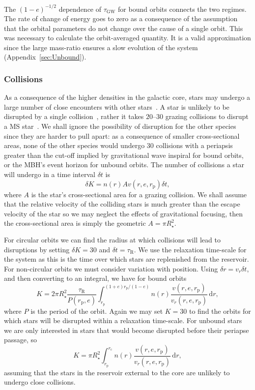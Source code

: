 \documentclass[useAMS,usedcolumn,usegraphicx,usenatbib]{mn2e}
\newcommand{\apref}[1]{Appendix~\ref{sec:#1}}
\newcommand{\sub}[1]{\ensuremath{_\mathrm{#1}}}
\newcommand{\dd}{\ensuremath{\mathrm{d}}}
\newcommand{\intd}[4]{\ensuremath{\displaystyle \int_{#1}^{#2}{#3}\,\dd{#4}}}
\begin{document}
The $(1-e)^{-1/2}$ dependence of $\tau\sub{GW}$ for bound orbits connects the two regimes. The rate of change of energy goes to zero as a consequence of the assumption that the orbital parameters do not change over the cause of a single orbit. This was necessary to calculate the orbit-averaged quantity. It is a valid approximation since the large mass-ratio ensures a slow evolution of the system (\apref{Unbound}).

\subsubsection{Collisions}\label{sec:Collision}

As a consequence of the higher densities in the galactic core, stars may undergo a large number of close encounters with other stars~\citep{Cohn1978}. A star is unlikely to be disrupted by a single collision~\citep{Murphy1991,Freitag2005}, rather it takes $20$--$30$ grazing collisions to disrupt a MS star~\citep{Freitag2006}. We shall ignore the possibility of disruption for the other species since they are harder to pull apart: as a consequence of smaller cross-sectional areas, none of the other species would undergo 30 collisions with a periapsis greater than the cut-off implied by gravitational wave inspiral for bound orbits, or the MBH's event horizon for unbound orbits. The number of collisions a star will undergo in a time interval $\delta t$ is
\begin{equation}
\delta K = n(r) A v(r,e,r\sub{p})\delta t,
\end{equation}
where $A$ is the star's cross-sectional area for a grazing collision. We shall assume that the relative velocity of the colliding stars is much greater than the escape velocity of the star so we may neglect the effects of gravitational focusing, then the cross-sectional area is simply the geometric $A = \pi R_\star^2$.

For circular orbits we can find the radius at which collisions will lead to disruptions by setting $\delta K = 30$ and $\delta t = \tau\sub{R}$. We use the relaxation time-scale for the system as this is the time over which stars are replenished from the reservoir. For non-circular orbits we must consider variation with position. Using $\delta r = v_r \delta t$, and then converting to an integral, we have for bound orbits
\begin{equation}
K = 2\pi R_\star^2 \frac{\tau\sub{R}}{P(r\sub{p},e)}\intd{r\sub{p}}{(1+e)r\sub{p}/(1-e)}{n(r)\frac{v(r,e,r\sub{p})}{v_r(r,e,r\sub{p})}}{r},
\end{equation}
where $P$ is the period of the orbit. Again we may set $K = 30$ to find the orbits for which stars will be disrupted within a relaxation time-scale. For unbound stars we are only interested in stars that would become disrupted before their periapse passage, so
\begin{equation}
K = \pi R_\star^2 \intd{r\sub{p}}{r\sub{c}}{n(r)\frac{v(r,e,r\sub{p})}{v_r(r,e,r\sub{p})}}{r},
\end{equation}
assuming that the stars in the reservoir external to the core are unlikely to undergo close collisions.
\end{document}
